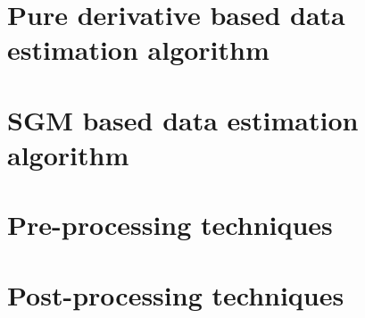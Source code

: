 \section{Pure derivative based data estimation algorithm}
\label{section:deriv-based-algorithm}

\section{SGM based data estimation algorithm}
\label{section:sgm-based-algorithm}


\section{Pre-processing techniques}
\label{section:pre-process-tech}

\section{Post-processing techniques}
\label{section:post-process-tech}

